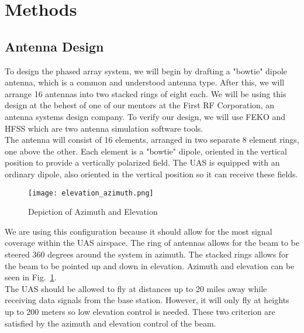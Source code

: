 \documentclass[UROP.tex]{subfiles}
\begin{document}
\bigskip
\section{\Large Methods}
\subsection{Antenna Design}

	To design the phased array system, we will begin by drafting a "bowtie" dipole antenna, which is a common and understood antenna type.  After this, we will arrange 16 antennas into two stacked rings of eight each.  We will be using this design at the behest of one of our mentors at the First RF Corporation, an antenna systems design company.  To verify our design, we will use FEKO and HFSS which are two antenna simulation software tools. \\

	The antenna will consist of 16 elements, arranged in two separate 8 element rings, one above the other.  Each element is a "bowtie" dipole, oriented in the vertical position to provide a vertically polarized field.  The UAS is equipped with an ordinary dipole, also oriented in the vertical position so it can receive these fields.  \\
	
	\begin{figure}[H]
		\centering
		\texttt{[image: elevation\_azimuth.png]}
		\caption{ Depiction of Azimuth and Elevation \label{fig:elevation_azimuth}}
	\end{figure}

	We are using this configuration because it should allow for the most signal coverage within the UAS airspace.  The ring of antennas allows for the beam to be steered 360 degrees around the system in azimuth.  The stacked rings allows for the beam to be pointed up and down in elevation.  Azimuth and elevation can be seen in Fig.~\ref{fig:elevation_azimuth}.  \\
	
	The UAS should be allowed to fly at distances up to 20 miles away while receiving data signals from the base station.  However, it will only fly at heights up to 200 meters so low elevation control is needed.  These two criterion are satisfied by the azimuth and elevation control of the beam.  \\

	
\end{document}
